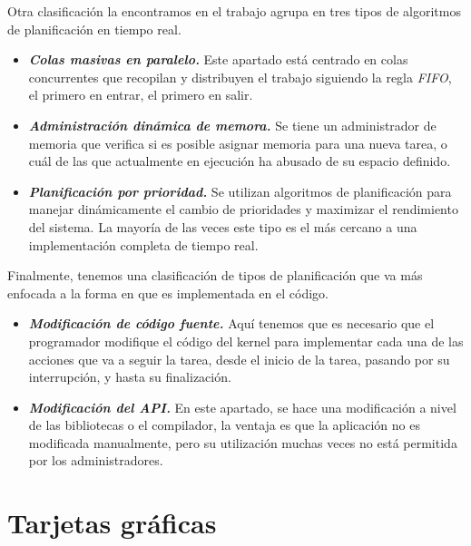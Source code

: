 \vspace{0.3cm}
	
Otra clasificación la encontramos en el trabajo \cite{DynSche} agrupa en tres tipos de algoritmos de planificación en tiempo real.

\begin{itemize}
\item \textbf{\textit{Colas masivas en paralelo.}}
	Este apartado está centrado en colas concurrentes que recopilan y distribuyen el trabajo siguiendo la regla \textit{FIFO}, el primero en entrar, el primero en salir. 
\item \textbf{\textit{Administración dinámica de memora.}}
	Se tiene un administrador de memoria que verifica si es posible asignar memoria para una nueva tarea, o cuál de las que actualmente en ejecución ha abusado de su espacio definido. 
\item \textbf{\textit{Planificación por prioridad.}}
	Se utilizan algoritmos de planificación para manejar dinámicamente el cambio de prioridades y maximizar el rendimiento del sistema. La mayoría de las veces este tipo es el más cercano a una implementación completa de tiempo real.
	
\end{itemize}

Finalmente, tenemos una clasificación de tipos de planificación que va más enfocada a la forma en que es implementada en el código.

\begin{itemize}
\item \textbf{\textit{Modificación de código fuente.}}
	Aquí tenemos que es necesario que el programador modifique el código del kernel para implementar cada una de las acciones que va a seguir la tarea, desde el inicio de la tarea, pasando por su interrupción, y hasta su finalización.
\item \textbf{\textit{Modificación del API.}}
	En este apartado, se hace una modificación a nivel de las bibliotecas o el compilador, la ventaja es que la aplicación no es modificada manualmente, pero su utilización muchas veces no está permitida por los administradores.
\end{itemize}

\section{Tarjetas gráficas}

